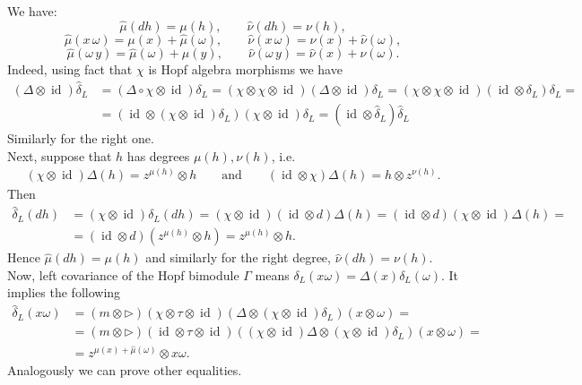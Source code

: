 \documentclass[12pt]{amsart}
\theoremstyle{definition}
\numberwithin{equation}{section}
\renewcommand{\a}{\chi}             %
\newcommand{\ox}{\otimes}           %
\DeclareMathOperator{\id}{id}       %
\begin{document}
We have:
$$ \hat{\mu}(dh) = \mu(h), \qquad \hat{\nu}(dh) = \nu(h), $$
$$ \hat{\mu}(x\, \omega) = \mu(x)+\hat{\mu}(\omega), \qquad \hat{\nu}(x\, \omega) = \nu(x) +\hat{\nu}(\omega), $$
$$ \hat{\mu}(\omega\, y) = \hat{\mu}(\omega)+{\mu}(y), \qquad \hat{\nu}(\omega\, y) = \hat{\nu}(x) +{\nu}(\omega). $$
Indeed, using fact that $\a $ is Hopf algebra morphisms we have
$$
\begin{aligned}
\left(\Delta\ox \id\right)\hat{\delta}_L &=\left(\Delta\circ\a \ox\id\right)\delta_L= \left(\a \ox\a \ox\id\right)\left(\Delta\ox\id\right)\delta_L= \left(\a \ox\a \ox\id\right)\left(\id\ox \delta_L\right)\delta_L= \\
&=\left(\id\ox\left(\a \ox\id\right)\delta_L\right)\left(\a \ox\id\right) \delta_L=\left(\id\ox\hat{\delta}_L\right)\hat{\delta}_L
\end{aligned}
$$
Similarly for the right one. \\
Next, suppose that $h$ has degrees $\mu(h),\nu(h)$, i.e.
$$\begin{aligned}
 \left(\a \ox\id\right)\Delta(h)=z^{\mu(h)}\ox h \qquad \mathrm{and} \qquad \left(\id\ox\a \right)\Delta(h)=h\ox z^{\nu(h)}.
 \end{aligned}$$
 Then 
 $$\begin{aligned}
 \hat{\delta}_L(dh)&=\left(\a \ox\id\right)\delta_L(dh)= \left(\a \ox\id\right)\left(\id\ox d\right)\Delta(h)= \left(\id\ox d\right)\left(\a \ox\id\right)\Delta(h)= \\ &=\left(\id\ox d\right)\left(z^{\mu(h)}\ox h \right)=z^{\mu(h)}\ox h.\end{aligned}$$
 Hence $\hat{\mu}(dh)=\mu(h)$ and similarly for the right degree, $\hat{\nu}(dh) = \nu(h)$. \\
 Now, left covariance of the Hopf bimodule $\Gamma$ means 
 $\delta_L(x\omega)=\Delta(x)\delta_L(\omega)$. It implies the following
 $$
 \begin{aligned}
  \hat{\delta}_L(x\omega)&=\left(m\ox\rhd\right)\left(\a \ox\tau\ox \id\right)\left(\Delta\ox\left(\a  \ox\id\right)\delta_L\right)\left( x\ox \omega\right)= \\ &=\left(m\ox\rhd\right)\left(\id\ox\tau\ox \id\right) \left(\left(\a \ox\id\right)\Delta \ox (\a \ox\id)\delta_L\right)\left(x\ox\omega\right)=
  \\ &=z^{\mu(x)+\hat{\mu}(\omega)}\ox x\omega. 
 \end{aligned}
 $$
 Analogously we can prove other equalities.
\end{document}
